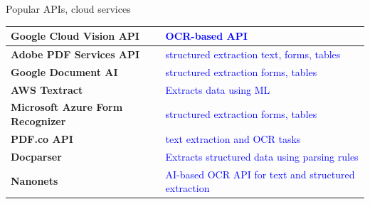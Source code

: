 

\begin{simpleCenteringTempChapterTable}{Popular APIs, cloud services}

    \def\cellOneA{\textbf{Google Cloud Vision API}}
    \def\cellOneB{\textcolor{blue}{OCR-based API}}

    \def\cellTwoA{\textbf{Adobe PDF Services API}}
    \def\cellTwoB{\textcolor{blue}{structured extraction text, forms, tables}}

    \def\cellThreeA{\textbf{Google Document AI}}
    \def\cellThreeB{\textcolor{blue}{structured extraction forms, tables}}

    \def\cellFourA{\textbf{AWS Textract}}
    \def\cellFourB{\textcolor{blue}{Extracts data using ML}}

    \def\cellFiveA{\textbf{Microsoft Azure Form Recognizer}}
    \def\cellFiveB{\textcolor{blue}{structured extraction forms, tables}}

    \def\cellSixA{\textbf{PDF.co API}}
    \def\cellSixB{\textcolor{blue}{text extraction and OCR tasks}}

    \def\cellSevenA{\textbf{Docparser}}
    \def\cellSevenB{\textcolor{blue}{Extracts structured data using parsing rules}}

    \def\cellEightA{\textbf{Nanonets}}
    \def\cellEightB{\textcolor{blue}{AI-based OCR API for text and structured extraction}}

    \begin{tabular}{|l|l|} \hline
        \cellOneA       &   \cellOneB       \\ \hline
        \cellTwoA       &   \cellTwoB       \\ \hline
        \cellThreeA     &   \cellThreeB     \\ \hline
        \cellFourA      &   \cellFourB      \\ \hline
        \cellFiveA      &   \cellFiveB      \\ \hline
        \cellSixA       &   \cellSixB       \\ \hline
        \cellSevenA     &   \cellSevenB     \\ \hline
        \cellEightA     &   \cellEightB     \\ \hline
    \end{tabular}

\end{simpleCenteringTempChapterTable}